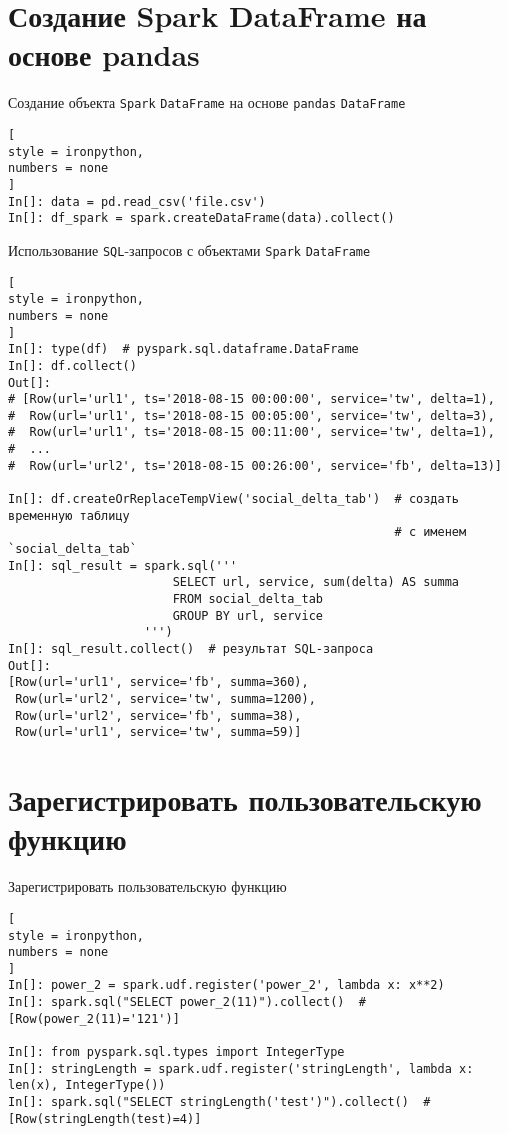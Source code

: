 \documentclass[%
	11pt,
	a4paper,
	utf8,
		]{article}
\begin{document}
\section{Создание Spark DataFrame на основе pandas}

Создание объекта \texttt{Spark} \texttt{DataFrame} на основе \texttt{pandas} \texttt{DataFrame}

\begin{lstlisting}[
style = ironpython,
numbers = none
]
In[]: data = pd.read_csv('file.csv')
In[]: df_spark = spark.createDataFrame(data).collect()
\end{lstlisting}


Использование \texttt{SQL}-запросов с объектами \texttt{Spark} \texttt{DataFrame}

\begin{lstlisting}[
style = ironpython,
numbers = none
]
In[]: type(df)  # pyspark.sql.dataframe.DataFrame
In[]: df.collect()
Out[]:
# [Row(url='url1', ts='2018-08-15 00:00:00', service='tw', delta=1),
#  Row(url='url1', ts='2018-08-15 00:05:00', service='tw', delta=3),
#  Row(url='url1', ts='2018-08-15 00:11:00', service='tw', delta=1),
#  ...
#  Row(url='url2', ts='2018-08-15 00:26:00', service='fb', delta=13)]

In[]: df.createOrReplaceTempView('social_delta_tab')  # создать временную таблицу
                                                      # с именем `social_delta_tab`
In[]: sql_result = spark.sql('''
                       SELECT url, service, sum(delta) AS summa
                       FROM social_delta_tab
                       GROUP BY url, service
                   ''')
In[]: sql_result.collect()  # результат SQL-запроса
Out[]:
[Row(url='url1', service='fb', summa=360),
 Row(url='url2', service='tw', summa=1200),
 Row(url='url2', service='fb', summa=38),
 Row(url='url1', service='tw', summa=59)]
\end{lstlisting}

\section{Зарегистрировать пользовательскую функцию}

Зарегистрировать пользовательскую функцию

\begin{lstlisting}[
style = ironpython,
numbers = none
]
In[]: power_2 = spark.udf.register('power_2', lambda x: x**2)
In[]: spark.sql("SELECT power_2(11)").collect()  # [Row(power_2(11)='121')]

In[]: from pyspark.sql.types import IntegerType
In[]: stringLength = spark.udf.register('stringLength', lambda x: len(x), IntegerType())
In[]: spark.sql("SELECT stringLength('test')").collect()  # [Row(stringLength(test)=4)]
\end{lstlisting}
\end{document}
